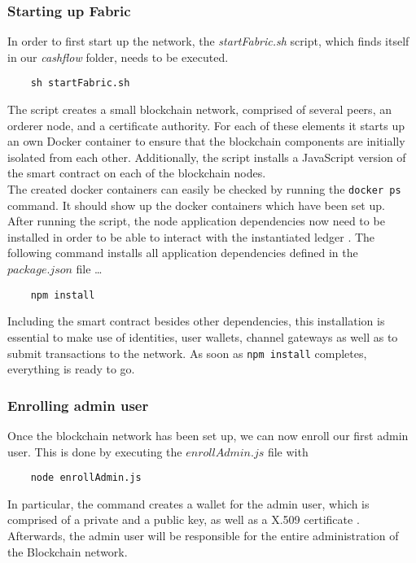\subsubsection{Starting up Fabric} \label{starting-up-fabric}
In order to first start up the network, the \textit{startFabric.sh} script, which finds itself in our \textit{cashflow} folder, needs to be executed.
\begin{verbatim}
	sh startFabric.sh
\end{verbatim}
The script creates a small blockchain network, comprised of several peers, an orderer node, and a certificate authority. For each of these elements it starts up an own Docker container to ensure that the blockchain components are initially isolated from each other. Additionally, the script installs a JavaScript version of the smart contract on each of the blockchain nodes. \\
The created docker containers can easily be checked by running the \texttt{docker ps} command. It should show up the docker containers which have been set up. \\
After running the script, the node application dependencies now need to be installed in order to be able to interact with the instantiated ledger \cite{Gaski2019}. The following command installs all application dependencies defined in the $ package.json $ file \ldots
\begin{verbatim}
	npm install
\end{verbatim}
Including the smart contract besides other dependencies, this installation is essential to make use of identities, user wallets, channel gateways as well as to submit transactions to the network. As soon as \texttt{npm install} completes, everything is ready to go. 

\subsubsection{Enrolling admin user}
Once the blockchain network has been set up, we can now enroll our first admin user. This is done by executing the $ enrollAdmin.js $ file with 
\begin{verbatim}
	node enrollAdmin.js
\end{verbatim}
In particular, the command creates a wallet for the admin user, which is comprised of a private and a public key, as well as a X.509 certificate \cite{Gaski2019}. 
Afterwards, the admin user will be responsible for the entire administration of the Blockchain network. 

